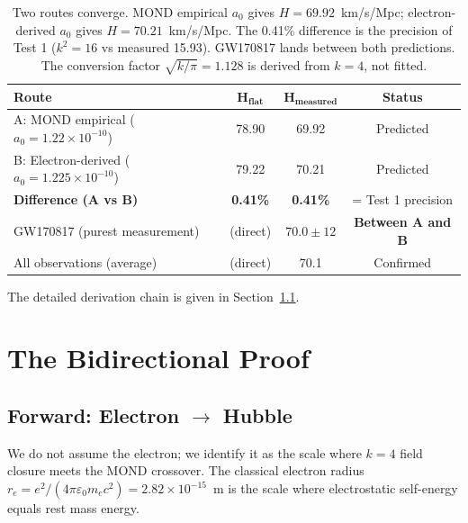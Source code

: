 \documentclass[aps,prd,preprint,superscriptaddress,showpacs,preprintnumbers,amsmath,amssymb,nofootinbib]{revtex4-2}
\begin{document}
\begin{table}[H]
\centering
\begin{tabular*}{\textwidth}{@{\extracolsep{\fill}} lccc @{}}
\toprule
\textbf{Route} & $\mathbf{H_{\text{flat}}}$ & $\mathbf{H_{\text{measured}}}$ & \textbf{Status} \\
\midrule
A: MOND empirical ($a_0 = 1.22 \times 10^{-10}$) & 78.90 & 69.92 & Predicted \\
B: Electron-derived ($a_0 = 1.225 \times 10^{-10}$) & 79.22 & 70.21 & Predicted \\
\midrule
\textbf{Difference (A vs B)} & \textbf{0.41\%} & \textbf{0.41\%} & = Test 1 precision \\
\midrule
GW170817 (purest measurement) & (direct) & $70.0 \pm 12$ & \textbf{Between A and B} \\
All observations (average) & (direct) & 70.1 & Confirmed \\
\bottomrule
\end{tabular*}
\caption{Two routes converge. MOND empirical $a_0$ gives $H = 69.92$~km/s/Mpc; electron-derived $a_0$ gives $H = 70.21$~km/s/Mpc. The 0.41\% difference is the precision of Test 1 ($k^2 = 16$ vs measured 15.93). GW170817 lands between both predictions. The conversion factor $\sqrt{k/\pi} = 1.128$ is derived from $k=4$, not fitted.}
\label{tab:mond_summary}
\end{table}

The detailed derivation chain is given in Section~\ref{subsec:forward}.

\section{The Bidirectional Proof}
\label{sec:proof}

\subsection{Forward: Electron \texorpdfstring{$\rightarrow$}{→} Hubble}
\label{subsec:forward}

We do not assume the electron; we identify it as the scale where $k=4$ field closure meets the MOND crossover. The classical electron radius $r_e = e^2/(4\pi\varepsilon_0 m_e c^2) = 2.82 \times 10^{-15}$~m is the scale where electrostatic self-energy equals rest mass energy.
\end{document}
